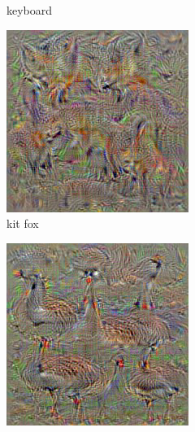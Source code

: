 \begin{figure}[t]
\begin{subfigure}[b]{0.3\textwidth}
    \caption{keyboard}
    \label{fig:sec:context:deep-visualization-class-4}
  \end{subfigure}
  \hfill
  \begin{subfigure}[b]{0.3\textwidth}
    \includegraphics[width=\textwidth]{gfx/deep-visualization-class-5}
    \caption{kit fox}
    \label{fig:sec:context:deep-visualization-class-5}
  \end{subfigure}
  \hfill
  \begin{subfigure}[b]{0.3\textwidth}
    \includegraphics[width=\textwidth]{gfx/deep-visualization-class-6}

\end{subfigure}
\end{figure}

